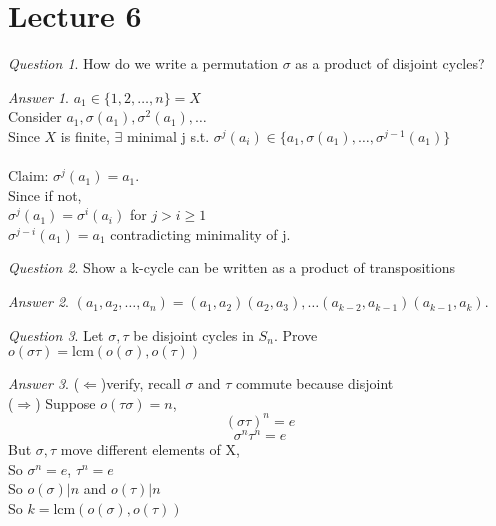 \documentclass[]{article}
\theoremstyle{remark}
\theoremstyle{qnstyle}
\newtheorem{question}{Question}
\theoremstyle{answerstyle}
\newtheorem*{answer}{Answer}
\begin{document}
\section* {Lecture 6}


\begin{question}
    How do we write a permutation $\sigma$ as a product of disjoint cycles?
\end{question}
\begin{answer}
    $a_1 \in \{1, 2, \ldots, n \} = X$ \\
    Consider $a_1, \sigma(a_1), \sigma^2(a_1), \ldots$ \\
    Since $X$ is finite, $\exists$ minimal j s.t. $\sigma^j(a_i) \in \{a_1, \sigma(a_1), \ldots, \sigma^{j-1}(a_1) \}$ \\ \\

    Claim: $\sigma^j(a_1) = a_1$. \\
    Since if not, \\
    $\sigma^j(a_1) = \sigma^i(a_i)$ for $j > i \geq 1$ \\
    $\sigma^{j-i}(a_1) = a_1$ contradicting minimality of j. \\

\end{answer}

\begin{question}
    Show a k-cycle can be written as a product of transpositions
\end{question}
\begin{answer}
    $(a_1, a_2, \ldots, a_n) = (a_1, a_2)(a_2, a_3), \ldots(a_{k-2}, a_{k-1})(a_{k-1}, a_k)$.
\end{answer}

\begin{question}
    Let $\sigma, \tau$ be disjoint cycles in $S_n$. Prove $o(\sigma \tau) = \text{lcm}(o(\sigma), o(\tau))$
\end{question}
\begin{answer}
    ($\Leftarrow$)verify, recall $\sigma$ and $\tau$ commute because disjoint \\
    ($\Rightarrow$) Suppose $o(\tau \sigma) = n$,
    $$(\sigma \tau)^n = e$$
    $$\sigma^n \tau^n = e$$
    But $\sigma, \tau$ move different elements of X,\\
    So $\sigma^n = e$, $\tau^n = e$\\
    So $o(\sigma) \vert n$ and $o(\tau) \vert n$\\
    So $k = \text{lcm}(o(\sigma), o(\tau))$
\end{answer}
\end{document}

